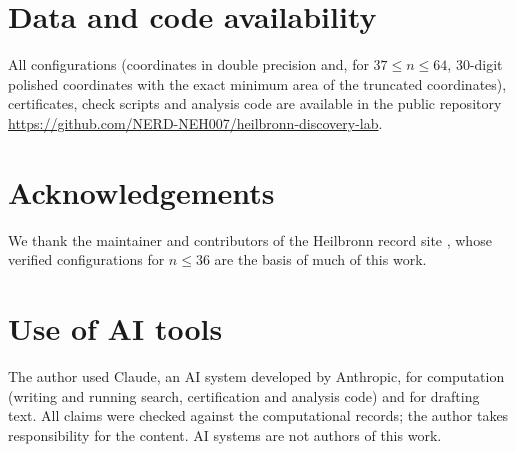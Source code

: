 \documentclass[11pt]{amsart}
\theoremstyle{definition}
\begin{document}
\begin{table}[htbp]
\centering\footnotesize
\setlength{\tabcolsep}{4pt}
\caption{Reproducibility status for $21 \le n \le 100$. The one size without a certificate, $n = 97$, is a KKT point with $d = 2$ (Section~\ref{sec:results}).}\label{tab:repro}

\end{table}

\section*{Data and code availability}
All configurations (coordinates in double precision and, for $37 \le n \le 64$, 30-digit polished coordinates with the exact minimum area of the truncated coordinates), certificates, check scripts and analysis code are available in the public repository \url{https://github.com/NERD-NEH007/heilbronn-discovery-lab}. %

\section*{Acknowledgements}
We thank the maintainer and contributors of the Heilbronn record site \cite{Stead}, whose verified configurations for $n \le 36$ are the basis of much of this work.

\section*{Use of AI tools}
The author used Claude, an AI system developed by Anthropic, for computation (writing and running search, certification and analysis code) and for drafting text. All claims were checked against the computational records; the author takes responsibility for the content. AI systems are not authors of this work.
\end{document}
